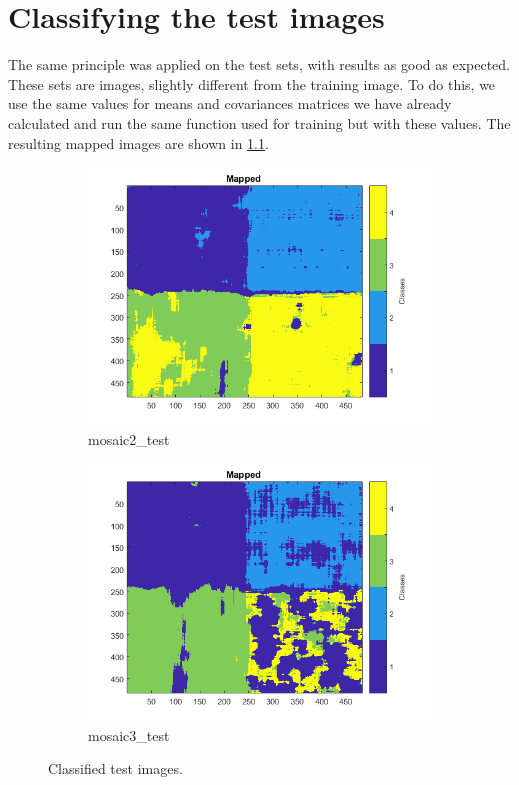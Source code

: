 \documentclass[a4paper, article, oneside, UKenglish]{memoir}
\newcommand{\0}{\mathbf{0}}
\newcommand{\1}{\mathbf{1}}
\begin{document}
\chapter{Classifying the test images}
The same principle was applied on the test sets, with results as good as expected. These sets are images, slightly different from the training image. To do this, we use the same values for means and covariances matrices we have already calculated and run the same function used for training but with these values. The resulting mapped images are shown in \cref{fig:testmapped}. 
\begin{figure}
  \centering
  \begin{subfigure}[b]{0.45\linewidth}
    \includegraphics[width=\linewidth]{./images/mapped2.png}
    \caption{mosaic2\_test}
  \end{subfigure}
  \begin{subfigure}[b]{0.45\linewidth}
    \includegraphics[width=\linewidth]{./images/mapped3.png}
    \caption{mosaic3\_test}
  \end{subfigure}
  \caption{Classified test images.}
  \label{fig:testmapped}
\end{figure}
\end{document}
